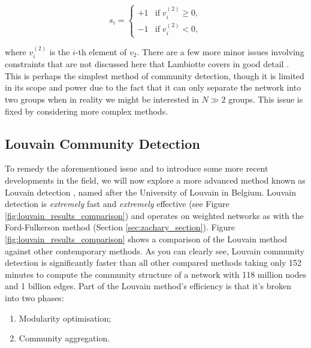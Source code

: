 $$ s_i = \begin{cases}
    +1 & \text{if} \; v_i^{(2)} \geq 0, \\
    -1 & \text{if} \; v_i^{(2)} < 0,
\end{cases} $$

\noindent
where $v_i^{(2)}$ is the $i$-th element of $v_2$. There are a few more minor issues involving constraints that are not discussed here that Lambiotte covers in good detail \cite[p. 27]{oxford:renaud_notes}. This is perhaps the simplest method of community detection, though it is limited in its scope and power due to the fact that it can only separate the network into two groups when in reality we might be interested in $N \gg 2$ groups. This issue is fixed by considering more complex methods.

\subsection{Louvain Community Detection}
To remedy the aforementioned issue and to introduce some more recent developments in the field, we will now explore a more advanced method known as Louvain detection \cite{Blondel_2008}, named after the University of Louvain in Belgium. Louvain detection is \emph{extremely} fast and \emph{extremely} effective (see Figure \ref{fig:louvain_results_comparison}) and operates on weighted networks as with the Ford-Fulkerson method (Section \ref{sec:zachary_section}). Figure \ref{fig:louvain_results_comparison} shows a comparison of the Louvain method against other contemporary methods. As you can clearly see, Louvain community detection is significantly faster than all other compared methods taking only 152 minutes to compute the community structure of a network with 118 million nodes and 1 billion edges. Part of the Louvain method's efficiency is that it's broken into two phases:

\begin{enumerate}
    \item Modularity optimisation;
    \item Community aggregation.
\end{enumerate}


